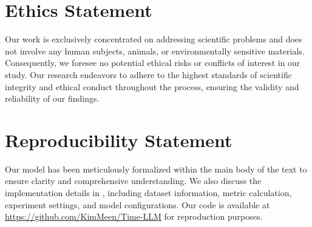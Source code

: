 
\section{Ethics Statement}
Our work is exclusively concentrated on addressing scientific problems and does not involve any human subjects, animals, or environmentally sensitive materials. Consequently, we foresee no potential ethical risks or conflicts of interest in our study. Our research endeavors to adhere to the highest standards of scientific integrity and ethical conduct throughout the process, ensuring the validity and reliability of our findings.

\section{Reproducibility Statement}
Our model has been meticulously formalized within the main body of the text to ensure clarity and comprehensive understanding. We also discuss the implementation details in , including dataset information, metric calculation, experiment settings, and model configurations. Our code is available at \url{https://github.com/KimMeen/Time-LLM} for reproduction purposes.